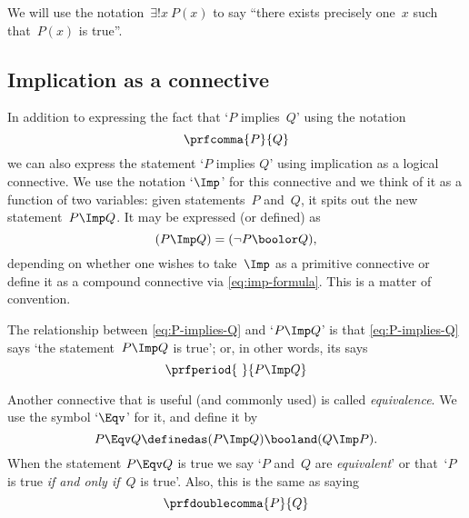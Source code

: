 We will use the notation~$\exists!
    x \ P(x)$ to say ``there exists precisely one~$x$ such that~$P(x)$ is true''.

\subsection{Implication as a connective}

In addition to expressing the fact that `$P$ implies~$Q$' using the notation
\begin{equation}\label{eq:P-implies-Q}
    \prfcomma
    {P}{Q}
\end{equation}
we can also express the statement `$P$ implies $Q$' using implication as a logical connective.
We use the notation `$\Imp$' for this connective and we think of it as a function of two variables:
given statements~$P$ and~$Q$, it spits out the new statement~$P \Imp Q$.
It may be expressed (or defined) as
\begin{equation}
    \label{eq:imp-formula}
    (P \Imp Q) = (\lnot P \boolor Q),
\end{equation}
depending on whether one wishes to take~$\Imp$ as a primitive connective or define it as a compound connective via \cref{eq:imp-formula}.
This is a matter of convention.

The relationship between \cref{eq:P-implies-Q} and `$P \Imp Q$' is that  \cref{eq:P-implies-Q} says `the statement~$P \Imp Q$ is true'; or, in other words, its says
\begin{equation*}
    \prfperiod
    {\ }{P \Imp Q}
\end{equation*}

Another connective that is useful (and commonly used) is called \emph{equivalence}.
We use the symbol `$\Eqv$' for it, and define it by
\begin{equation*}
    P \Eqv Q \definedas (P \Imp Q) \booland (Q \Imp P).
\end{equation*}
When the statement $P \Eqv Q$ is true we say `$P$ and~$Q$ are \emph{equivalent}' or that~`$P$ is true \emph{if and only if}~$Q$ is true'.
Also, this is the same as saying
\begin{equation*}
    \prfdoublecomma{
        P
    }{
        Q
    }
\end{equation*}

